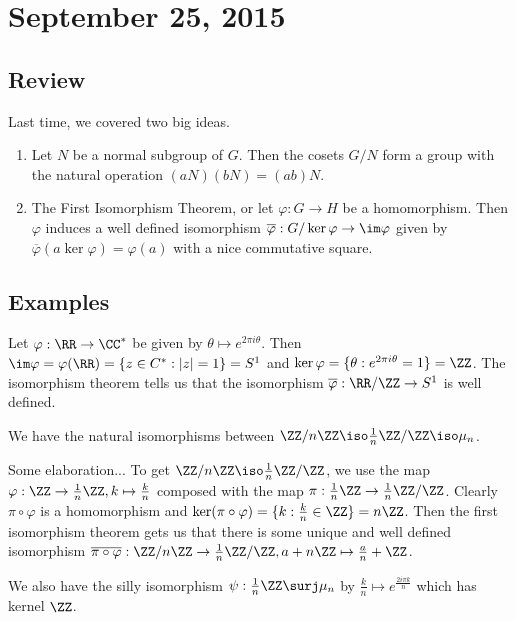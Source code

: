 \section{September 25, 2015}

\subsection{Review}

Last time, we covered two big ideas.
\begin{enumerate}
\item Let $N$ be a normal subgroup of $G$. Then the cosets $G/N$ form a
group with the natural operation $(aN)(bN) = (ab)N$.
\item The First Isomorphism Theorem, or let $\varphi : G \to H$ be a
homomorphism. Then $\varphi$ induces a well defined isomorphism
$\overline{\varphi} : G / \ker \varphi \to \im \varphi$ given by
$\overline{\varphi}(a \ker \varphi) = \varphi(a)$ with a nice
commutative square.
\end{enumerate}

\subsection{Examples}
\begin{ex}
Let $\varphi : \RR \to \CC^*$ be given by $\theta \mapsto e^{2 \pi i
\theta}$. Then $\im \varphi = \varphi(\RR) = \lbrace z \in C^* : |z| = 1
\rbrace = S^1$ and $\ker \varphi = \lbrace \theta : e^{2 \pi i \theta} =
1 \rbrace = \ZZ$. The isomorphism theorem tells us that the isomorphism
$\overline{\varphi} : \RR / \ZZ \to S^1$ is well defined.
\end{ex}

\begin{ex}
We have the natural isomorphisms between $\ZZ / n\ZZ \iso \frac{1}{n}
\ZZ / \ZZ \iso \mu_n$.

Some elaboration... To get $\ZZ / n\ZZ \iso \frac{1}{n}\ZZ / \ZZ$, we
use the map $\varphi : \ZZ \to \frac{1}{n}\ZZ, k \mapsto \frac{k}{n}$
composed with the map $\pi : \frac{1}{n}\ZZ \to \frac{1}{n}\ZZ / \ZZ$.
Clearly $\pi \circ \varphi$ is a homomorphism and $\ker(\pi \circ
\varphi) = \lbrace k : \frac{k}{n} \in \ZZ \rbrace = n\ZZ$. Then the
first isomorphism theorem gets us that there is some unique and well
defined isomorphism $\overline{\pi \circ \varphi} : \ZZ / n\ZZ \to
\frac{1}{n}\ZZ / \ZZ, a + n\ZZ \mapsto \frac{a}{n} + \ZZ$.

We also have the silly isomorphism $\psi : \frac{1}{n}\ZZ \surj \mu_n$
by $\frac{k}{n} \mapsto e^{\frac{2 i \pi k}{n}}$ which has kernel $\ZZ$.
\end{ex}

